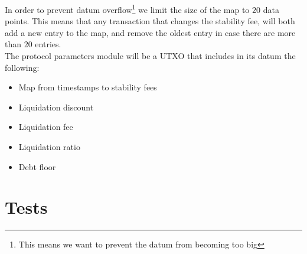 \documentclass{article} %
\begin{document}
In order to prevent datum overflow\footnote{
  This means we want to prevent the datum from becoming too big}
we limit the size of the map to $20$ data points.
This means that any transaction that changes the stability fee, will both add a
new entry to the map, and remove the oldest entry in case there are more than
$20$ entries. \\

The protocol parameters module will be a UTXO that includes in its datum the following:
\begin{itemize}
  \item Map from timestamps to stability fees
  \item Liquidation discount
  \item Liquidation fee
  \item Liquidation ratio
  \item Debt floor
\end{itemize}

\section{Tests}

%





\end{document}
